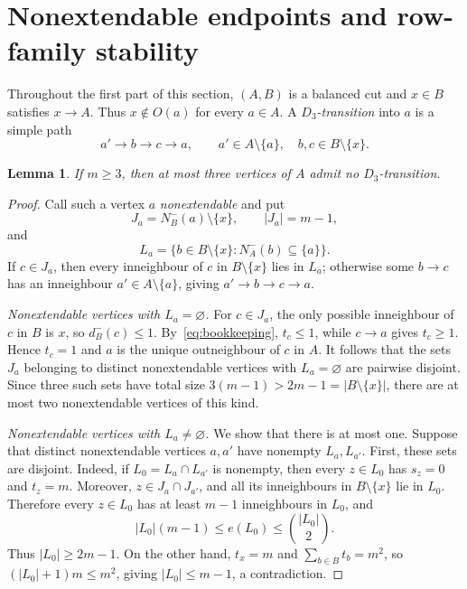 \documentclass[11pt]{amsart}
\newtheorem{lemma}[theorem]{Lemma}
\theoremstyle{definition}
\begin{document}
\section{Nonextendable endpoints and row-family stability}\label{sec:stability}

Throughout the first part of this section, $(A,B)$ is a balanced cut and $x\in B$ satisfies $x\to A$.  Thus $x\notin O(a)$ for every $a\in A$.  A \emph{$D_3$-transition} into $a$ is a simple path
\[
  a'\to b\to c\to a,
  \qquad a'\in A\setminus\{a\},\quad b,c\in B\setminus\{x\}.
\]

\begin{lemma}\label{lem:dead}
If $m\ge3$, then at most three vertices of $A$ admit no $D_3$-transition.
\end{lemma}

\begin{proof}
Call such a vertex $a$ \emph{nonextendable} and put
\[
  J_a=N_B^-(a)\setminus\{x\},\qquad |J_a|=m-1,
\]
and
\[
  L_a=\{b\in B\setminus\{x\}:N_A^-(b)\subseteq\{a\}\}.
\]
If $c\in J_a$, then every inneighbour of $c$ in $B\setminus\{x\}$ lies in $L_a$; otherwise some $b\to c$ has an inneighbour $a'\in A\setminus\{a\}$, giving $a'\to b\to c\to a$.

\smallskip
\noindent\emph{Nonextendable vertices with $L_a=\varnothing$.}
For $c\in J_a$, the only possible inneighbour of $c$ in $B$ is $x$,
so $d_B^-(c)\le1$.  By~\eqref{eq:bookkeeping}, $t_c\le1$, while
$c\to a$ gives $t_c\ge1$.  Hence $t_c=1$ and $a$ is the unique
outneighbour of $c$ in $A$.  It follows that the sets $J_a$ belonging
to distinct nonextendable vertices with $L_a=\varnothing$ are pairwise
disjoint.  Since three such sets have total size
$3(m-1)>2m-1=|B\setminus\{x\}|$, there are at most two nonextendable
vertices of this kind.

\smallskip
\noindent\emph{Nonextendable vertices with $L_a\ne\varnothing$.}
We show that there is at most one.  Suppose that distinct nonextendable
vertices $a,a'$ have nonempty $L_a,L_{a'}$.  First, these sets are
disjoint.  Indeed, if $L_0=L_a\cap L_{a'}$ is nonempty, then every
$z\in L_0$ has $s_z=0$ and $t_z=m$.  Moreover,
$z\in J_a\cap J_{a'}$, and all its inneighbours in
$B\setminus\{x\}$ lie in $L_0$.  Therefore every $z\in L_0$ has at
least $m-1$ inneighbours in $L_0$, and
\[
  |L_0|(m-1)\le e(L_0)\le\binom{|L_0|}{2}.
\]
Thus $|L_0|\ge2m-1$.  On the other hand, $t_x=m$ and $\sum_{b\in B}t_b=m^2$, so $(|L_0|+1)m\le m^2$, giving $|L_0|\le m-1$, a contradiction.


\end{proof}
\end{document}
